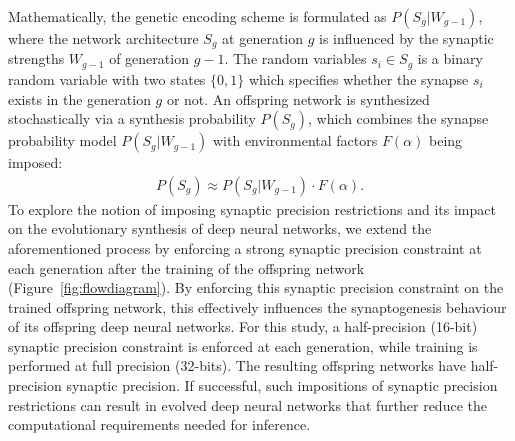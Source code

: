 \documentclass[10pt,letterpaper]{article}
\begin{document}
Mathematically, the genetic encoding scheme is formulated as $P(S_g|W_{g-1})$, where the network architecture $S_g$ at generation $g$ is influenced by the synaptic strengths $W_{g-1}$ of generation \mbox{$g-1$}.  The random variables $s_i \in S_g$ is a binary random variable with two states $\{0, 1\}$ which specifies whether the synapse $s_i$ exists in the generation $g$ or not. An offspring network is synthesized stochastically via a synthesis probability $P(S_g)$, which combines the synapse probability model $P(S_g|W_{g-1})$ with environmental factors $F(\alpha)$ being imposed:
\begin{align}
P(S_g) \approx P(S_g|W_{g-1}) \cdot F(\alpha).
\end{align}
To explore the notion of imposing synaptic precision restrictions and its impact on the evolutionary synthesis of deep neural networks, we extend the aforementioned process by enforcing a strong synaptic precision constraint at each generation after the training of the offspring network (Figure~\ref{fig:flowdiagram}).  By enforcing this synaptic precision constraint on the trained offspring network, this effectively influences the synaptogenesis behaviour of its offspring deep neural networks.  For this study, a half-precision (16-bit) synaptic precision constraint is enforced at each generation, while training is performed at full precision (32-bits).  The resulting offspring networks have half-precision synaptic precision.  If successful, such impositions of synaptic precision restrictions can result in evolved deep neural networks that further reduce the computational requirements needed for inference.



\vspace{-0.2 cm}
\end{document}
